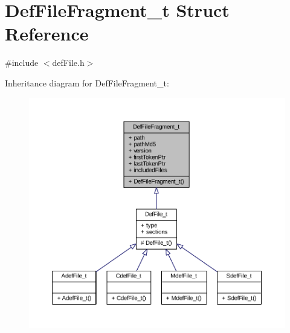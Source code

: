 \hypertarget{struct_def_file_fragment__t}{}\section{Def\+File\+Fragment\+\_\+t Struct Reference}
\label{struct_def_file_fragment__t}


{\ttfamily \#include $<$def\+File.\+h$>$}



Inheritance diagram for Def\+File\+Fragment\+\_\+t\+:
\nopagebreak
\begin{figure}[H]
\begin{center}
\leavevmode
\includegraphics[width=350pt]{struct_def_file_fragment__t__inherit__graph}
\end{center}
\end{figure}


